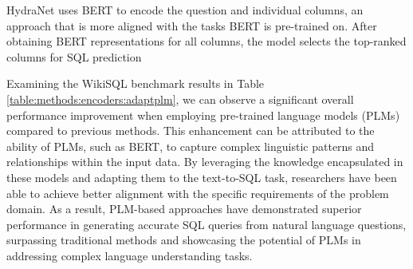 HydraNet\cite{lyu_hybrid_2020} uses BERT to encode the question and individual columns, an approach that is more aligned with the tasks BERT is pre-trained on. After obtaining BERT representations for all columns, the model selects the top-ranked columns for SQL prediction


\begin{table}[t]
    \centering
    \caption{The execution accuracy on the WikiSQL dev set.}
    \label{table:methods:encoders:adaptplm}
\end{table}

Examining the WikiSQL benchmark results in Table \ref{table:methods:encoders:adaptplm}, we can observe a significant overall performance improvement when employing pre-trained language models (PLMs) compared to previous methods. This enhancement can be attributed to the ability of PLMs, such as BERT, to capture complex linguistic patterns and relationships within the input data. By leveraging the knowledge encapsulated in these models and adapting them to the text-to-SQL task, researchers have been able to achieve better alignment with the specific requirements of the problem domain. As a result, PLM-based approaches have demonstrated superior performance in generating accurate SQL queries from natural language questions, surpassing traditional methods and showcasing the potential of PLMs in addressing complex language understanding tasks.
